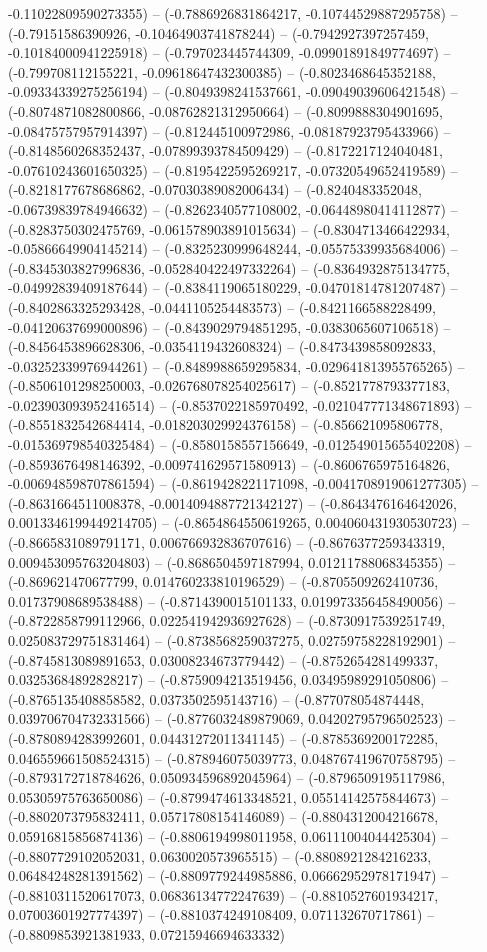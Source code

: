-0.11022809590273355) -- (-0.7886926831864217, -0.10744529887295758) -- (-0.79151586390926, -0.10464903741878244) -- (-0.7942927397257459, -0.10184000941225918) -- (-0.797023445744309, -0.09901891849774697) -- (-0.799708112155221, -0.09618647432300385) -- (-0.8023468645352188, -0.09334339275256194) -- (-0.8049398241537661, -0.09049039606421548) -- (-0.8074871082800866, -0.08762821312950664) -- (-0.8099888304901695, -0.08475757957914397) -- (-0.812445100972986, -0.08187923795433966) -- (-0.8148560268352437, -0.07899393784509429) -- (-0.8172217124040481, -0.07610243601650325) -- (-0.8195422595269217, -0.07320549652419589) -- (-0.8218177678686862, -0.07030389082006434) -- (-0.8240483352048, -0.06739839784946632) -- (-0.8262340577108002, -0.06448980414112877) -- (-0.8283750302475769, -0.061578903891015634) -- (-0.8304713466422934, -0.05866649904145214) -- (-0.8325230999648244, -0.05575339935684006) -- (-0.8345303827996836, -0.052840422497332264) -- (-0.8364932875134775, -0.04992839409187644) -- (-0.8384119065180229, -0.04701814781207487) -- (-0.8402863325293428, -0.0441105254483573) -- (-0.8421166588228499, -0.04120637699000896) -- (-0.8439029794851295, -0.0383065607106518) -- (-0.8456453896628306, -0.0354119432608324) -- (-0.8473439858092833, -0.03252339976944261) -- (-0.8489988659295834, -0.029641813955765265) -- (-0.8506101298250003, -0.026768078254025617) -- (-0.8521778793377183, -0.023903093952416514) -- (-0.8537022185970492, -0.021047771348671893) -- (-0.8551832542684414, -0.018203029924376158) -- (-0.856621095806778, -0.015369798540325484) -- (-0.8580158557156649, -0.012549015655402208) -- (-0.8593676498146392, -0.009741629571580913) -- (-0.8606765975164826, -0.006948598707861594) -- (-0.8619428221171098, -0.0041708919061277305) -- (-0.8631664511008378, -0.0014094887721342127) -- (-0.8643476164642026, 0.0013346199449214705) -- (-0.8654864550619265, 0.004060431930530723) -- (-0.8665831089791171, 0.006766932836707616) -- (-0.8676377259343319, 0.009453095763204803) -- (-0.8686504597187994, 0.01211788068345355) -- (-0.869621470677799, 0.014760233810196529) -- (-0.8705509262410736, 0.01737908689538488) -- (-0.8714390015101133, 0.019973356458490056) -- (-0.8722858799112966, 0.022541942936927628) -- (-0.8730917539251749, 0.025083729751831464) -- (-0.8738568259037275, 0.02759758228192901) -- (-0.8745813089891653, 0.03008234673779442) -- (-0.8752654281499337, 0.03253684892828217) -- (-0.8759094213519456, 0.03495989291050806) -- (-0.8765135408858582, 0.0373502595143716) -- (-0.877078054874448, 0.039706704732331566) -- (-0.8776032489879069, 0.04202795796502523) -- (-0.8780894283992601, 0.04431272011341145) -- (-0.8785369200172285, 0.046559661508524315) -- (-0.878946075039773, 0.048767419670758795) -- (-0.8793172718784626, 0.050934596892045964) -- (-0.8796509195117986, 0.05305975763650086) -- (-0.8799474613348521, 0.05514142575844673) -- (-0.8802073795832411, 0.05717808154146089) -- (-0.8804312004216678, 0.05916815856874136) -- (-0.8806194998011958, 0.06111004044425304) -- (-0.8807729102052031, 0.0630020573965515) -- (-0.8808921284216233, 0.06484248281391562) -- (-0.8809779244985886, 0.06662952978171947) -- (-0.8810311520617073, 0.06836134772247639) -- (-0.8810527601934217, 0.07003601927774397) -- (-0.8810374249108409, 0.071132670717861) -- (-0.8809853921381933, 0.07215946694633332) 